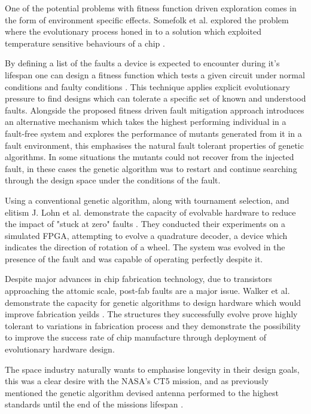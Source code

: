 One of the potential problems with fitness function driven exploration comes in
the form of environment specific effects. Somefolk et al. explored the problem
where the evolutionary process honed in to a solution which exploited temperature
sensitive behaviours of a chip \cite{10.1007/BFb0057603}.

By defining a list of the faults a device is expected to encounter during it's
lifespan one can design a fitness function which tests a given circuit under
normal conditions and faulty conditions \cite{651463}\cite{Keymeulen2000}. This technique applies explicit
evolutionary pressure to find designs which can tolerate a specific set of
known and understood faults. Alongside the proposed fitness driven fault mitigation
approach \cite{Keymeulen2000} introduces an alternative mechanism which takes the
highest performing individual in a fault-free system and explores the performance
of mutants generated from it in a fault environment, this emphasises the natural
fault tolerant properties of genetic algorithms. In some situations the mutants
could not recover from the injected fault, in these cases the genetic algorithm
was to restart and continue searching through the design space under the conditions
of the fault.

Using a conventional genetic algorithm, along with tournament selection, and elitism
J. Lohn et al. demonstrate the capacity
of evolvable hardware to reduce the impact of "stuck at zero" faults \cite{10.1007/3-540-36553-2_5}. They
conducted their experiments on a simulated FPGA, attempting to evolve a quadrature
decoder, a device which indicates
the direction of rotation of a wheel. The system was evolved in the presence
of the fault and was capable of operating perfectly despite it.

Despite major advances in chip fabrication technology, due to transistors
approaching the attomic scale, post-fab faults are a major issue. Walker et al.
demonstrate the capacity for genetic algorithms to design hardware which would
improve fabrication yeilds \cite{10.1007/978-3-540-85857-7_27}. The structures
they successfully evolve prove highly tolerant to variations in fabrication process
and they demonstrate the possibility to improve the success rate of chip manufacture
through deployment of evolutionary hardware design.

The space industry naturally wants to emphasise longevity in their design goals,
this was a clear desire with the NASA's CT5 mission, and as previously mentioned
the genetic algorithm devised antenna performed to the highest standards until the
end of the missions lifespan \cite{Antenna}.

